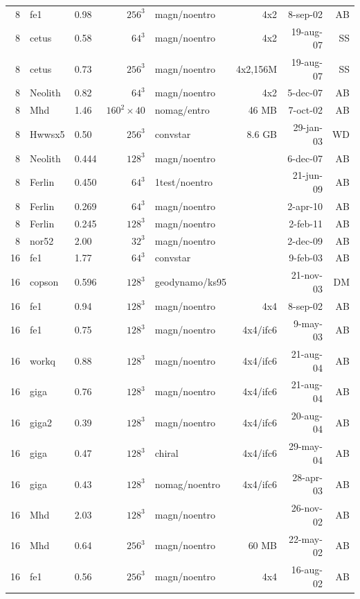 \documentclass[\mydriver,12pt,twoside,notitlepage,a4paper]{article}
\begin{document}
\begin{center}
\begin{small}
\begin{longtable}{rllrlrrr}
   8 & fe1   & 0.98 & $256^3$ & magn/noentro &  4x2   &  8-sep-02 & AB \\
   8 & cetus & 0.58 & $ 64^3$ & magn/noentro &4x2     & 19-aug-07 & SS \\
   8 & cetus & 0.73 & $256^3$ & magn/noentro &4x2,156M& 19-aug-07 & SS \\
   8 &Neolith& 0.82 &  $64^3$ & magn/noentro &4x2     &  5-dec-07 & AB \\
   8 & Mhd   & 1.46 & $160^2\times40$
                              & nomag/entro &  46 MB &  7-oct-02 & AB \\
   8 & Hwwsx5& 0.50 & $256^3$ & convstar     & 8.6 GB & 29-jan-03 & WD \\
   8 &Neolith& 0.444& $128^3$ & magn/noentro &        &  6-dec-07 & AB \\
   8 &Ferlin & 0.450&  $64^3$ &1test/noentro &        & 21-jun-09 & AB \\
   8 &Ferlin & 0.269&  $64^3$ & magn/noentro &        &  2-apr-10 & AB \\
   8 &Ferlin & 0.245& $128^3$ & magn/noentro &        &  2-feb-11 & AB \\
   8 &nor52  & 2.00 &  $32^3$ & magn/noentro &        &  2-dec-09 & AB \\
  16 & fe1   & 1.77 &  $64^3$ & convstar     &        &  9-feb-03 & AB \\
  16 & copson& 0.596& $128^3$ & geodynamo/ks95 &      & 21-nov-03 & DM \\
  16 & fe1   & 0.94 & $128^3$ & magn/noentro &  4x4   &  8-sep-02 & AB \\
  16 & fe1   & 0.75 & $128^3$ & magn/noentro &4x4/ifc6&  9-may-03 & AB \\
  16 & workq & 0.88 & $128^3$ & magn/noentro &4x4/ifc6& 21-aug-04 & AB \\
  16 & giga  & 0.76 & $128^3$ & magn/noentro &4x4/ifc6& 21-aug-04 & AB \\
  16 & giga2 & 0.39 & $128^3$ & magn/noentro &4x4/ifc6& 20-aug-04 & AB \\
  16 & giga  & 0.47 & $128^3$ & chiral       &4x4/ifc6& 29-may-04 & AB \\
  16 & giga  & 0.43 & $128^3$ & nomag/noentro&4x4/ifc6& 28-apr-03 & AB \\
  16 & Mhd   & 2.03 & $128^3$ & magn/noentro &        & 26-nov-02 & AB \\
  16 & Mhd   & 0.64 & $256^3$ & magn/noentro &  60 MB & 22-may-02 & AB \\
  16 & fe1   & 0.56 & $256^3$ & magn/noentro &  4x4   & 16-aug-02 & AB \\

\end{longtable}
\end{small}
\end{center}
\end{document}
